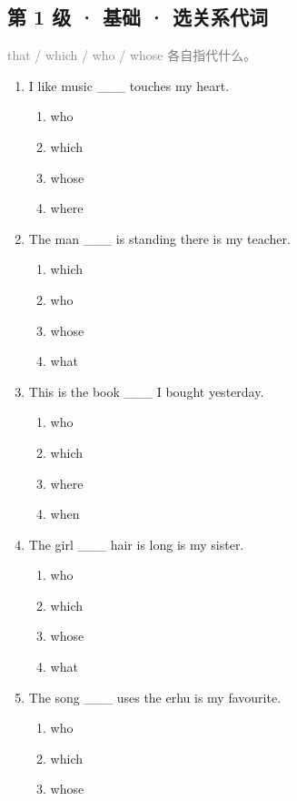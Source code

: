 \documentclass[11pt,a4paper]{ctexart}
\begin{document}
\subsection*{第 1 级 · 基础 · 选关系代词}
\noindent\textcolor{gray}{that / which / who / whose 各自指代什么。}\par\smallskip
\begin{enumerate}[leftmargin=*,itemsep=4pt]
\item I like music \_\_\_ touches my heart.
\begin{enumerate}[label=\Alph*.,leftmargin=2em,itemsep=1pt,topsep=2pt]
\item who
\item which
\item whose
\item where
\end{enumerate}
\item The man \_\_\_ is standing there is my teacher.
\begin{enumerate}[label=\Alph*.,leftmargin=2em,itemsep=1pt,topsep=2pt]
\item which
\item who
\item whose
\item what
\end{enumerate}
\item This is the book \_\_\_ I bought yesterday.
\begin{enumerate}[label=\Alph*.,leftmargin=2em,itemsep=1pt,topsep=2pt]
\item who
\item which
\item where
\item when
\end{enumerate}
\item The girl \_\_\_ hair is long is my sister.
\begin{enumerate}[label=\Alph*.,leftmargin=2em,itemsep=1pt,topsep=2pt]
\item who
\item which
\item whose
\item what
\end{enumerate}
\item The song \_\_\_ uses the erhu is my favourite.
\begin{enumerate}[label=\Alph*.,leftmargin=2em,itemsep=1pt,topsep=2pt]
\item who
\item which
\item whose

\end{enumerate}
\end{enumerate}
\end{document}
